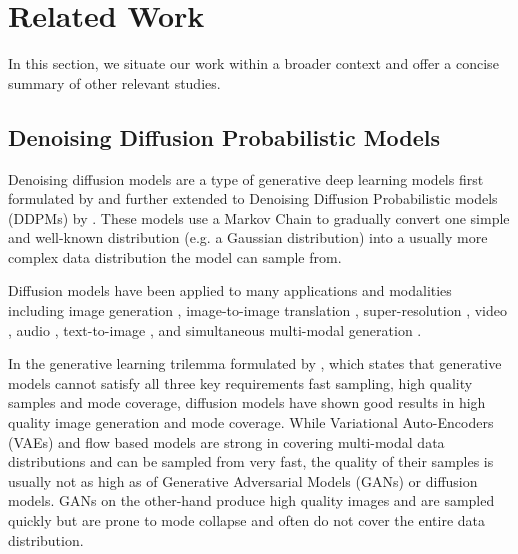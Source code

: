 \section{Related Work} \label{sec:related_work}
In this section, we situate our work within a broader context and offer a concise summary of other relevant studies.

\subsection{Denoising Diffusion Probabilistic Models} Denoising diffusion models are a type of generative deep learning models first formulated by \cite{sohl-dickstein_deep_2015} and further extended to Denoising Diffusion Probabilistic models (DDPMs) by \cite{ho_denoising_2020,nichol_improved_2021}. These models use a Markov Chain to gradually convert one simple and well-known distribution (e.g. a Gaussian distribution) into a usually more complex data distribution the model can sample from. 

Diffusion models have been applied to many applications and modalities including image generation \citep{dhariwal_diffusion_2021}, image-to-image translation \citep{saharia_palette_2022}, super-resolution \citep{ho_cascaded_2021, saharia_image_2021}, video \citep{ho_video_2022,harvey_flexible_2022,yang_diffusion_2022}, audio \citep{kong_diffwave_2021,lee_priorgrad_2022}, text-to-image \citep{ramesh_hierarchical_2022, nichol_towards_2022,saharia_photorealistic_2022}, and simultaneous multi-modal generation \citep{ruan_mm-diffusion_2023}.

In the generative learning trilemma formulated by \cite{xiao_tackling_2022}, which states that generative models cannot satisfy all three key requirements fast sampling, high quality samples and mode coverage, diffusion models have shown good results in high quality image generation \citep{rampas_novel_2023,ho_cascaded_2021} and mode coverage. While Variational Auto-Encoders (VAEs) \citep{kingma_auto-encoding_2022,razavi_generating_2019} and flow based models \citep{dinh_density_2017,durkan_neural_2019} are strong in covering multi-modal data distributions and can be sampled from very fast, the quality of their samples is usually not as high as of Generative Adversarial Models (GANs) or diffusion models. GANs \citep{goodfellow_generative_2014,brock_large_2019,kirch_vologan_2022} on the other-hand produce high quality images and are sampled quickly but are prone to mode collapse and often do not cover the entire data distribution.

